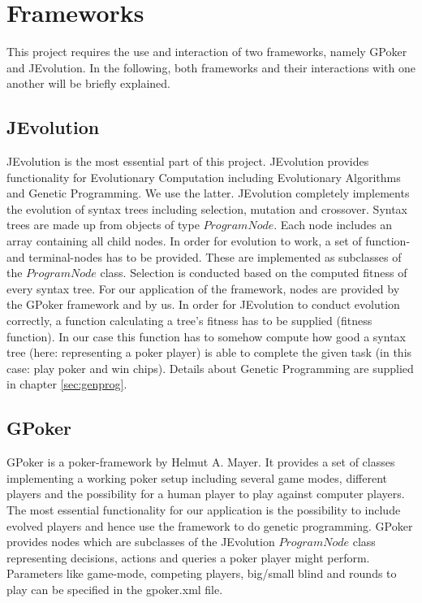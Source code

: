 \section{Frameworks}
This project requires the use and interaction of two frameworks, namely GPoker and JEvolution. In the following, both frameworks and their interactions with one another will be briefly explained.

\subsection{JEvolution}
JEvolution is the most essential part of this project. JEvolution provides functionality for Evolutionary Computation including Evolutionary Algorithms and Genetic Programming.
We use the latter. JEvolution completely implements the evolution of syntax trees including selection, mutation and crossover. Syntax trees are made up from objects of type
$ProgramNode$. Each node includes an array containing all child nodes. In order for evolution to work, a set of function- and terminal-nodes has to be provided. These
are implemented as subclasses of the $ProgramNode$ class. Selection is conducted based on the computed fitness of every syntax tree. For our application of the framework,
nodes are provided by the GPoker framework and by us. In order for JEvolution to conduct evolution correctly, a function calculating a tree's fitness has to be supplied (fitness function). In
our case this function has to somehow compute how good a syntax tree (here: representing a poker player) is able to complete the given task (in this case: play poker and win
chips). Details about Genetic Programming are supplied in chapter \ref{sec:genprog}.

\subsection{GPoker}
GPoker is a poker-framework by Helmut A. Mayer. It provides a set of classes implementing a working poker setup including several game modes, different players and the
possibility for a human player to play against computer players. The most essential functionality for our application is the possibility to include evolved players and hence
use the framework to do genetic programming. GPoker provides nodes which are subclasses of the JEvolution $ProgramNode$ class representing decisions, actions and queries a
poker player might perform. Parameters like game-mode, competing players, big/small blind and rounds to play can be specified in the gpoker.xml file.


